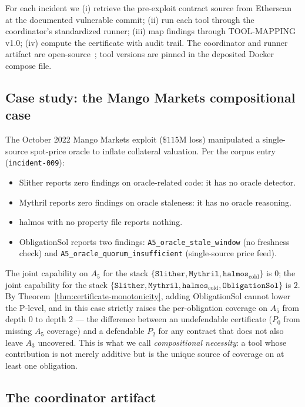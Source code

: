 \documentclass[11pt,a4paper]{article}
\begin{document}
For each incident we (i) retrieve the pre-exploit contract source from Etherscan at the documented vulnerable commit; (ii) run each tool through the coordinator's standardized runner; (iii) map findings through TOOL-MAPPING v1.0; (iv) compute the certificate with audit trail. The coordinator and runner artifact are open-source~\cite{parallax5coordinator}; tool versions are pinned in the deposited Docker compose file.

\subsection{Case study: the Mango Markets compositional case}\label{sec:case-mango}

The October 2022 Mango Markets exploit ($\$115$M loss) manipulated a single-source spot-price oracle to inflate collateral valuation. Per the corpus entry (\texttt{incident-009}):

\begin{itemize}
\item Slither reports zero findings on oracle-related code: it has no oracle detector.
\item Mythril reports zero findings on oracle staleness: it has no oracle reasoning.
\item halmos with no property file reports nothing.
\item ObligationSol reports two findings: \texttt{A5\_oracle\_stale\_window} (no freshness check) and \texttt{A5\_oracle\_\allowbreak quorum\_insufficient} (single-source price feed).
\end{itemize}

The joint capability on $A_5$ for the stack $\{\texttt{Slither}, \texttt{Mythril}, \texttt{halmos}_\text{cold}\}$ is $0$; the joint capability for the stack $\{\texttt{Slither}, \texttt{Mythril}, \texttt{halmos}_\text{cold}, \texttt{ObligationSol}\}$ is $2$. By Theorem~\ref{thm:certificate-monotonicity}, adding ObligationSol cannot lower the P-level, and in this case strictly raises the per-obligation coverage on $A_5$ from depth 0 to depth 2 — the difference between an undefendable certificate ($P_0$ from missing $A_5$ coverage) and a defendable $P_2$ for any contract that does not also leave $A_3$ uncovered. This is what we call \emph{compositional necessity}: a tool whose contribution is not merely additive but is the unique source of coverage on at least one obligation.

\subsection{The coordinator artifact}\label{sec:coordinator-artifact}
\end{document}
